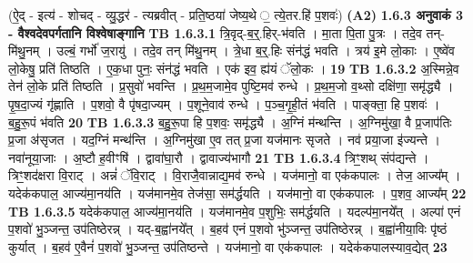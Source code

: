 \documentclass[17pt]{extarticle}
\begin{document}
                  \newline
                                    (ऐ॒द् - इत्य॑ - शोचद् - व्यु॒द्धर॑ - त्यब्रवीत् - प्रति॒ष्ठया॑ जेष्य॒थे ॒ त्ये॒तर.हि॑ प॒शवः॑) \textbf{(A2)} \newline \newline
                \textbf{ 1.6.3     अनुवाकं   3 - वैश्वदेवपर्गतानि विश्वेषाङ्गानि} \newline
                                \textbf{ TB 1.6.3.1} \newline
                  त्रि॒वृद्-ब॒र्॒.हिर्-भ॑वति । मा॒ता पि॒ता पु॒त्रः । तदे॒व तन्-मि॑थु॒नम् । उल्बं॒ गर्भो॑ ज॒रायु॑ । तदे॒व तन् मि॑थु॒नम् । त्रे॒धा ब॒र्॒.हिः संन॑द्धं भवति । त्रय॑ इ॒मे लो॒काः । ए॒ष्वे॑व लो॒केषु॒ प्रति॑ तिष्ठति । ए॒क॒धा पुनः॒ संन॑द्धं भवति । एक॑ इव॒ ह्य॑यं ॅलो॒कः । \textbf{ 19} \newline
                  \newline
                                \textbf{ TB 1.6.3.2} \newline
                  अ॒स्मिन्ने॒व तेन॑ लो॒के प्रति॑ तिष्ठति । प्र॒सुवो॑ भवन्ति । प्र॒थ॒म॒जामे॒व पुष्टि॒मव॑ रुन्धे । प्र॒थ॒म॒जो व॒थ्सो दक्षि॑णा॒ समृ॑द्ध्यै । पृ॒ष॒दा॒ज्यं गृ॑ह्णाति । प॒शवो॒ वै पृ॑षदा॒ज्यम् । प॒शूने॒वाव॑ रुन्धे । प॒ञ्च॒गृ॒ही॒तं भ॑वति । पाङ्क्ता॒ हि प॒शवः॑ । ब॒हु॒रू॒पं भ॑वति \textbf{ 20} \newline
                  \newline
                                \textbf{ TB 1.6.3.3} \newline
                  ब॒हु॒रू॒पा हि प॒शवः॒ समृ॑द्ध्यै । अ॒ग्निं म॑न्थन्ति । अ॒ग्निमु॑खा॒ वै प्र॒जाप॑तिः प्र॒जा अ॑सृजत । यद॒ग्निं मन्थ॑न्ति । अ॒ग्निमु॑खा ए॒व तत् प्र॒जा यज॑मानः सृजते । नव॑ प्रया॒जा इ॑ज्यन्ते । नवा॑नूया॒जाः । अ॒ष्टौ ह॒वीꣳषि॑ । द्वावा॑घा॒रौ । द्वावाज्य॑भागौ \textbf{ 21} \newline
                  \newline
                                \textbf{ TB 1.6.3.4} \newline
                  त्रिꣳ॒॒शथ् संप॑द्यन्ते । त्रिꣳ॒॒शद॑क्षरा वि॒राट् । अन्नं॑ ॅवि॒राट् । वि॒राजै॒वान्नाद्य॒मव॑ रुन्धे । यज॑मानो॒ वा एक॑कपालः । तेज॒ आज्य᳚म् । यदेक॑कपाल॒ आज्य॑मा॒नय॑ति । यज॑मानमे॒व तेज॑सा॒ सम॑र्द्धयति । यज॑मानो॒ वा एक॑कपालः । प॒शव॒ आज्य᳚म् \textbf{ 22} \newline
                  \newline
                                \textbf{ TB 1.6.3.5} \newline
                  यदेक॑कपाल॒ आज्य॑मा॒नय॑ति । यज॑मानमे॒व प॒शुभिः॒ सम॑र्द्धयति । यदल्प॑मा॒नये᳚त् । अल्पा॑ एनं प॒शवो॑ भु॒ञ्जन्त॒ उप॑तिष्ठेरन्न् । यद्-ब॒ह्वा॑नये᳚त् । ब॒हव॑ एनं प॒शवो भु॑ञ्जन्त॒ उप॑तिष्ठेरन्न् । ब॒ह्वा॑नीया॒विः पृ॑ष्ठं कुर्यात् । ब॒हव॑ ए॒वैनं॑ प॒शवो॑ भु॒ञ्जन्त॒ उप॑तिष्ठन्ते । यज॑मानो॒ वा एक॑कपालः । यदेक॑कपालस्याव॒द्येत् \textbf{ 23} \newline
\end{document}
